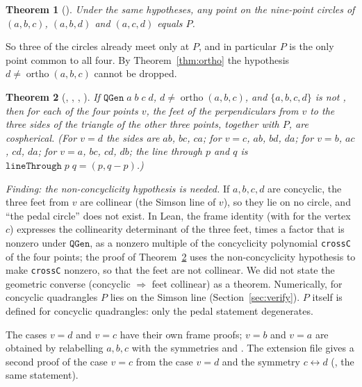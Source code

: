 \documentclass[11pt]{article}
\newtheorem{theorem}{Theorem}
\theoremstyle{definition}
\theoremstyle{remark}
\newcommand{\lean}[1]{\texttt{#1}}
\begin{document}
\begin{theorem}[]\label{thm:unique}
Under the same hypotheses, any point on the nine-point circles of $(a,b,c)$, $(a,b,d)$ and $(a,c,d)$
equals $P$.
\end{theorem}
So three of the circles already meet only at $P$, and in particular $P$ is the only point common to all
four. By Theorem~\ref{thm:ortho} the hypothesis $d\neq\operatorname{ortho}(a,b,c)$ cannot be dropped.

\begin{theorem}[, , , ]\label{thm:pedal}
If $\lean{QGen}\;a\;b\;c\;d$, $d\neq\operatorname{ortho}(a,b,c)$, and $\{a,b,c,d\}$ is not
, then for each of the four points $v$, the feet of the
perpendiculars from $v$ to the three sides of the triangle of the other three points, together with $P$,
are cospherical. (For $v=d$ the sides are $ab$, $bc$, $ca$; for $v=c$, $ab$, $bd$, $da$; for $v=b$, $ac$,
$cd$, $da$; for $v=a$, $bc$, $cd$, $db$; the line through $p$ and $q$ is $\lean{lineThrough}\;p\;q=(p,q-p)$.)
\end{theorem}
\emph{Finding: the non-concyclicity hypothesis is needed.} If $a,b,c,d$ are concyclic, the three feet
from $v$ are collinear (the Simson line of $v$), so they lie on no circle, and ``the pedal circle''
does not exist. In Lean, the frame identity  (with  for the
vertex $c$) expresses the collinearity determinant of the three feet, times a factor that is nonzero
under $\lean{QGen}$, as a nonzero multiple of the concyclicity polynomial \lean{crossC} of the four
points; the proof of Theorem~\ref{thm:pedal} uses the non-concyclicity hypothesis to make \lean{crossC}
nonzero, so that the feet are not collinear. We did not state the geometric converse (concyclic
$\Rightarrow$ feet collinear) as a theorem.
Numerically, for concyclic quadrangles $P$ lies on the Simson line (Section~\ref{sec:verify}). $P$
itself is defined for concyclic quadrangles: only the pedal statement degenerates.

The cases $v=d$ and $v=c$ have their own frame proofs; $v=b$ and $v=a$ are obtained by relabelling
$a,b,c$ with the symmetries  and . The
extension file gives a second proof of the case $v=c$ from the case $v=d$ and the symmetry $c\leftrightarrow d$
(, the same statement).
\end{document}
